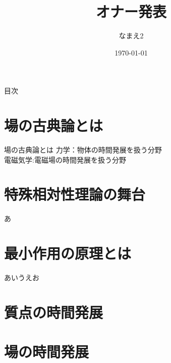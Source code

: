 \documentclass[unicode, lualatex, aspectratio=169, 10.5pt]{beamer}
\title[オナー発表]{オナー発表} %
\author[なまえ1]{なまえ2}     %
\institute[A]{B}              %
\date{\today}                 %
\begin{document}
\begin{frame}
  \titlepage
\end{frame}

\begin{frame}{目次}
  \tableofcontents
\end{frame}


\section{場の古典論とは}

\begin{frame}{場の古典論とは}
  力学：物体の時間発展を扱う分野\\
  電磁気学:電磁場の時間発展を扱う分野
\end{frame}



\section{特殊相対性理論の舞台}

\begin{frame}
  あ
\end{frame}



\section{最小作用の原理とは}

\begin{frame}
  あいうえお
\end{frame}


\section{質点の時間発展}



\section{場の時間発展}
\end{document}
